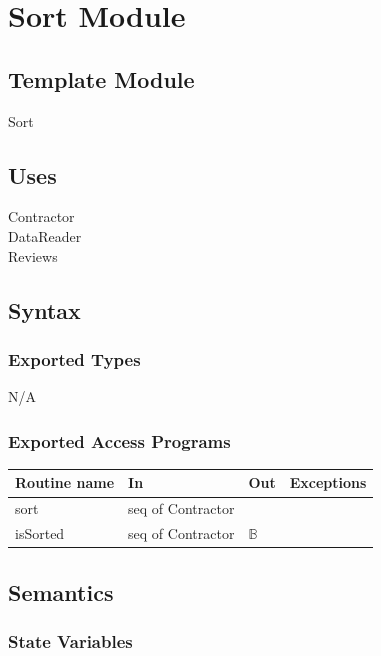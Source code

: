 \documentclass[12pt]{scrartcl}
\begin{document}
\newpage

\section {Sort Module}

\subsection{Template Module}

Sort

\subsection {Uses}

Contractor \\
DataReader \\
Reviews 

\subsection {Syntax}

\subsubsection {Exported Types}

N/A

\subsubsection {Exported Access Programs}

\begin{tabular}{| l | l | l | l |}
\hline
\textbf{Routine name} & \textbf{In} & \textbf{Out} & \textbf{Exceptions}\\
\hline
sort & seq of Contractor &  & \\
\hline
isSorted & seq of Contractor & $\mathbb{B}$ & \\
\hline

\end{tabular}

\subsection {Semantics}

\subsubsection {State Variables}
\end{document}
